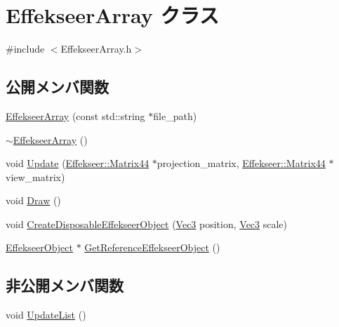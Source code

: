 \hypertarget{class_effekseer_array}{}\section{Effekseer\+Array クラス}
\label{class_effekseer_array}


{\ttfamily \#include $<$Effekseer\+Array.\+h$>$}

\subsection*{公開メンバ関数}
\begin{DoxyCompactItemize}
\item 
\mbox{\hyperlink{class_effekseer_array_ae598c1486d263356b63ba8d08a3afc20}{Effekseer\+Array}} (const std\+::string $\ast$file\+\_\+path)
\item 
\mbox{\hyperlink{class_effekseer_array_af5e7c360c77737f0c46b3a9dad2725ac}{$\sim$\+Effekseer\+Array}} ()
\item 
void \mbox{\hyperlink{class_effekseer_array_a41fcca7eb106c1c83851eca1284800f4}{Update}} (\mbox{\hyperlink{struct_effekseer_1_1_matrix44}{Effekseer\+::\+Matrix44}} $\ast$projection\+\_\+matrix, \mbox{\hyperlink{struct_effekseer_1_1_matrix44}{Effekseer\+::\+Matrix44}} $\ast$view\+\_\+matrix)
\item 
void \mbox{\hyperlink{class_effekseer_array_af915edc4a955bfc7927721a71016524d}{Draw}} ()
\item 
void \mbox{\hyperlink{class_effekseer_array_a8c86aa79851ef86f253c13765f708383}{Create\+Disposable\+Effekseer\+Object}} (\mbox{\hyperlink{_vector3_d_8h_ab16f59e4393f29a01ec8b9bbbabbe65d}{Vec3}} position, \mbox{\hyperlink{_vector3_d_8h_ab16f59e4393f29a01ec8b9bbbabbe65d}{Vec3}} scale)
\item 
\mbox{\hyperlink{class_effekseer_object}{Effekseer\+Object}} $\ast$ \mbox{\hyperlink{class_effekseer_array_a0bbf7d610ef2219e3699d3f26182af03}{Get\+Reference\+Effekseer\+Object}} ()
\end{DoxyCompactItemize}
\subsection*{非公開メンバ関数}
\begin{DoxyCompactItemize}
\item 
void \mbox{\hyperlink{class_effekseer_array_a39f6631cc74add5fe2193998df78ec1e}{Update\+List}} ()
\end{DoxyCompactItemize}
